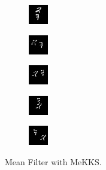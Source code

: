     \begin{subfigure}[t]{0.9\textwidth}
        \centering
        \begin{subfigure}[t]{0.19\textwidth}
            \centering
            \includegraphics[scale=2]{figures/MeKKS-DIFFERENCING/frame0}
        \end{subfigure}
        \hfill
        \begin{subfigure}[t]{0.19\textwidth}
            \centering
            \includegraphics[scale=2]{figures/MeKKS-DIFFERENCING/frame4}
        \end{subfigure}
        \hfill
        \begin{subfigure}[t]{0.19\textwidth}
            \centering
            \includegraphics[scale=2]{figures/MeKKS-DIFFERENCING/frame8}
        \end{subfigure}
        \hfill
        \begin{subfigure}[t]{0.19\textwidth}
            \centering
            \includegraphics[scale=2]{figures/MeKKS-DIFFERENCING/frame12}
        \end{subfigure}
        \hfill
        \begin{subfigure}[t]{0.19\textwidth}
            \centering
            \includegraphics[scale=2]{figures/MeKKS-DIFFERENCING/frame16}
        \end{subfigure}
        \caption{Mean Filter with MeKKS.}
    \end{subfigure}
    \\ \bigskip
